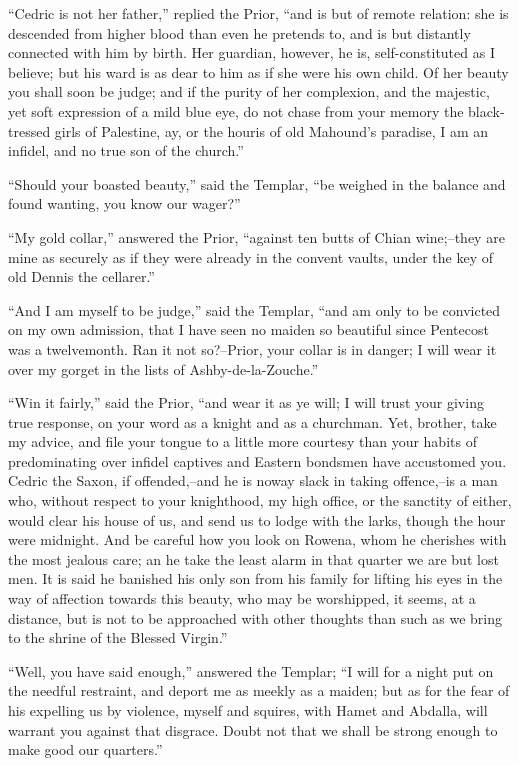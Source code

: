 ``Cedric is not her father,'' replied the Prior, ``and is but of remote
relation: she is descended from higher blood than even he pretends to,
and is but distantly connected with him by birth. Her guardian, however,
he is, self-constituted as I believe; but his ward is as dear to him as
if she were his own child. Of her beauty you shall soon be judge; and if
the purity of her complexion, and the majestic, yet soft expression of a
mild blue eye, do not chase from your memory the black-tressed girls of
Palestine, ay, or the houris of old Mahound's paradise, I am an infidel,
and no true son of the church.''

``Should your boasted beauty,'' said the Templar, ``be weighed in the
balance and found wanting, you know our wager?''

``My gold collar,'' answered the Prior, ``against ten butts of Chian
wine;--they are mine as securely as if they were already in the convent
vaults, under the key of old Dennis the cellarer.''

``And I am myself to be judge,'' said the Templar, ``and am only to be
convicted on my own admission, that I have seen no maiden so beautiful
since Pentecost was a twelvemonth. Ran it not so?--Prior, your collar is
in danger; I will wear it over my gorget in the lists of
Ashby-de-la-Zouche.''

``Win it fairly,'' said the Prior, ``and wear it as ye will; I will
trust your giving true response, on your word as a knight and as a
churchman. Yet, brother, take my advice, and file your tongue to a
little more courtesy than your habits of predominating over infidel
captives and Eastern bondsmen have accustomed you. Cedric the Saxon, if
offended,--and he is noway slack in taking offence,--is a man who,
without respect to your knighthood, my high office, or the sanctity of
either, would clear his house of us, and send us to lodge with the
larks, though the hour were midnight. And be careful how you look on
Rowena, whom he cherishes with the most jealous care; an he take the
least alarm in that quarter we are but lost men. It is said he banished
his only son from his family for lifting his eyes in the way of
affection towards this beauty, who may be worshipped, it seems, at a
distance, but is not to be approached with other thoughts than such as
we bring to the shrine of the Blessed Virgin.''

``Well, you have said enough,'' answered the Templar; ``I will for a
night put on the needful restraint, and deport me as meekly as a maiden;
but as for the fear of his expelling us by violence, myself and squires,
with Hamet and Abdalla, will warrant you against that disgrace. Doubt
not that we shall be strong enough to make good our quarters.''

